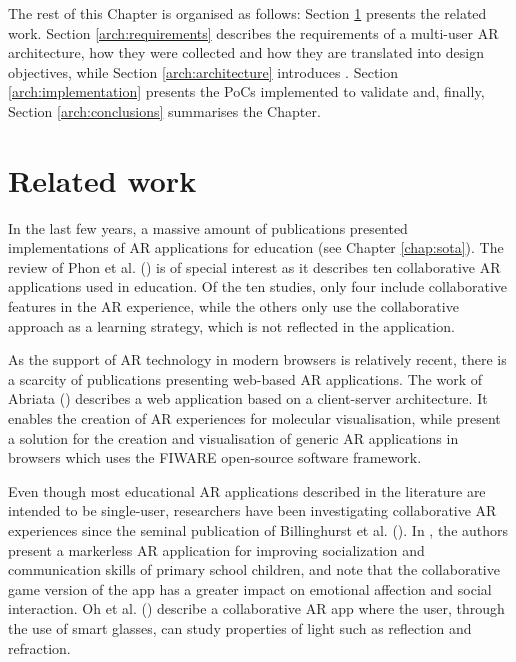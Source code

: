 The rest of this Chapter is organised as follows: Section \ref{arch:related} presents the related work. Section \ref{arch:requirements} describes the requirements of a multi-user AR architecture, how they were collected and how they are translated into design objectives, while Section \ref{arch:architecture} introduces \arch{}. Section \ref{arch:implementation} presents the PoCs implemented to validate \arch{} and, finally, Section \ref{arch:conclusions} summarises the Chapter.


\section{Related work}\label{arch:related}

In the last few years, a massive amount of publications presented implementations of AR applications for education (see Chapter \ref{chap:sota}). The review of Phon et al. (\citeyear{6821833}) is of special interest as it describes ten collaborative AR applications used in education. Of the ten studies, only four include collaborative features in the AR experience, while the others only use the collaborative approach as a learning strategy, which is not reflected in the application.

As the support of AR technology in modern browsers is relatively recent, there is a scarcity of publications presenting web-based AR applications. 
The work of Abriata (\citeyear{abriata2020building}) describes a web application based on a client-server architecture. It enables the creation of AR experiences for molecular visualisation, while \cite{coma2019fi} present a solution for the creation and visualisation of generic AR applications in browsers which uses the FIWARE open-source software framework.

Even though most educational AR applications described in the literature are intended to be single-user, researchers have been investigating collaborative AR experiences since the seminal publication of Billinghurst et al. (\citeyear{billinghurst2002collaborative}). In \cite{lopez2020emofindar}, the authors present a markerless AR application for improving socialization and communication skills of primary school children, and note that the collaborative game version of the app has a greater impact on emotional affection and social interaction. Oh et al. (\citeyear{oh2017hybrid}) describe a collaborative AR app where the user, through the use of smart glasses, can study properties of light such as reflection and refraction.

